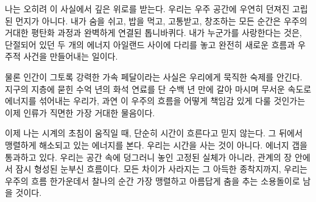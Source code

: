 \documentclass[12pt,a4paper]{article}
\begin{document}
나는 오히려 이 사실에서 깊은 위로를 받는다. 우리는 우주 공간에 우연히 던져진 고립된 먼지가 아니다. 내가 숨을 쉬고, 밥을 먹고, 고통받고, 창조하는 모든 순간은 우주의 거대한 평탄화 과정과 완벽하게 연결된 톱니바퀴다. 내가 누군가를 사랑한다는 것은, 단절되어 있던 두 개의 에너지 아일랜드 사이에 다리를 놓고 완전히 새로운 흐름과 우주적 사건을 만들어내는 일이다.

물론 인간이 그토록 강력한 가속 페달이라는 사실은 우리에게 묵직한 숙제를 안긴다. 지구의 지층에 묻힌 수억 년의 화석 연료를 단 수백 년 만에 갈아 마시며 무서운 속도로 에너지를 섞어내는 우리가, 과연 이 우주의 흐름을 어떻게 책임감 있게 다룰 것인가는 이제 인류가 직면한 가장 거대한 물음이다.

이제 나는 시계의 초침이 움직일 때, 단순히 시간이 흐른다고 믿지 않는다. 그 뒤에서 맹렬하게 해소되고 있는 에너지를 본다. 우리는 시간을 사는 것이 아니다. 에너지 갭을 통과하고 있다. 우리는 공간 속에 덩그러니 놓인 고정된 실체가 아니라, 관계의 장 안에서 잠시 형성된 눈부신 흐름이다. 모든 차이가 사라지는 그 아득한 종착지까지, 우리는 우주의 흐름 한가운데서 찰나의 순간 가장 맹렬하고 아름답게 춤을 추는 소용돌이로 남을 것이다.
\end{document}
